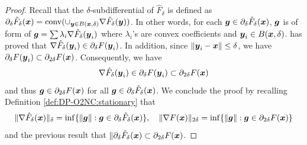 \begin{proof}
Recall that the $\delta$-subdifferential of $\hat F_\delta$ is defined as \\
$\partial_\delta \hat F_\delta({\boldsymbol{x}}) = \operatorname{conv}(\cup_{{\boldsymbol{y}} \in B({\boldsymbol{x}},\delta)} \nabla \hat F_\delta ({\boldsymbol{y}}))$. In other words, for each ${\boldsymbol{g}}\in \partial_\delta \hat F_\delta({\boldsymbol{x}})$, ${\boldsymbol{g}}$ is of form of ${\boldsymbol{g}}=\sum \lambda_i \nabla \hat F_\delta({\boldsymbol{y}}_i)$ where $\lambda_i$’s are convex coefficients and ${\boldsymbol{y}}_i\in B({\boldsymbol{x}},\delta)$. \citep[Theorem 10]{lin2022gradient} has proved that $\nabla \hat F_\delta({\boldsymbol{y}}_i) \in \partial_\delta F({\boldsymbol{y}}_i)$. In addition, since $\|{\boldsymbol{y}}_i-{\boldsymbol{x}}\| \le \delta$, we have $\partial_\delta F({\boldsymbol{y}}_i) \subset \partial_{2\delta} F({\boldsymbol{x}})$. Consequently, we have 
\begin{equation*}
    \nabla \hat F_\delta({\boldsymbol{y}}_i) \in \partial_\delta F({\boldsymbol{y}}_i) \subset \partial_{2\delta}F({\boldsymbol{x}})
\end{equation*}
and thus ${\boldsymbol{g}} \in \partial_{2\delta} F({\boldsymbol{x}})$ for all ${\boldsymbol{g}}\in\partial_\delta\hat F_\delta({\boldsymbol{x}})$. We conclude the proof by recalling Definition \ref{def:DP-O2NC:stationary} that 
\begin{equation*}
    \|\nabla \hat F_\delta ({\boldsymbol{x}})\|_\delta = \inf \{\|{\boldsymbol{g}}\|: {\boldsymbol{g}}\in \partial_\delta \hat F_\delta({\boldsymbol{x}})\}, \quad \|\nabla F({\boldsymbol{x}})\|_{2\delta} = \inf \{\|{\boldsymbol{g}}\|: {\boldsymbol{g}}\in \partial_{2\delta} F({\boldsymbol{x}})\}
\end{equation*}
and the previous result that $\|\partial_\delta \hat F_\delta({\boldsymbol{x}}) \subset \partial_{2\delta} F({\boldsymbol{x}})$.
\end{proof}
